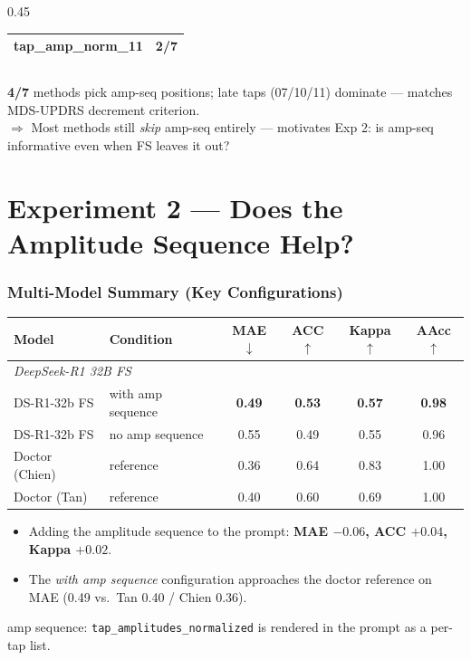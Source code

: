 \documentclass[aspectratio=169]{beamer}
\begin{document}
\begin{frame}
\begin{columns}[T]
\begin{column}{0.45\textwidth}
\begin{tabular}{lc}
                \cellcolor{green!15}tap\_amp\_norm\_11 & \cellcolor{green!15}2/7 \\
                \bottomrule
            \end{tabular}
        \end{column}
    \end{columns}
    \vspace{0.2em}
    \scriptsize
    \textbf{4/7} methods pick amp-seq positions; late taps (07/10/11) dominate --- matches MDS-UPDRS decrement criterion.\\
    \textbf{$\Rightarrow$} Most methods still \emph{skip} amp-seq entirely --- motivates Exp 2: is amp-seq informative even when FS leaves it out?
\end{frame}

\section{Experiment 2 --- Does the Amplitude Sequence Help?}

\begin{frame}
    \frametitle{Multi-Model Summary (Key Configurations)}
    {\scriptsize
    \setlength{\tabcolsep}{3pt}
    \begin{center}
    \begin{tabular}{llcccc}
        \toprule
        \textbf{Model} & \textbf{Condition} & \textbf{MAE}$\downarrow$ & \textbf{ACC}$\uparrow$ & \textbf{Kappa}$\uparrow$ & \textbf{AAcc}$\uparrow$ \\
        \midrule
        \multicolumn{6}{l}{\textit{DeepSeek-R1 32B FS}} \\
        DS-R1-32b FS & with amp sequence & \cellcolor{green!15}\textbf{0.49} & \cellcolor{green!15}\textbf{0.53} & \cellcolor{green!15}\textbf{0.57} & \cellcolor{green!15}\textbf{0.98} \\
        DS-R1-32b FS & no amp sequence   & 0.55 & 0.49 & 0.55 & 0.96 \\
        \midrule
        \rowcolor{gray!15} Doctor (Chien) & reference & 0.36 & 0.64 & 0.83 & 1.00 \\
        \rowcolor{gray!15} Doctor (Tan)   & reference & 0.40 & 0.60 & 0.69 & 1.00 \\
        \bottomrule
    \end{tabular}
    \end{center}
    }
    \vspace{0.3em}
    \footnotesize
    \begin{itemize}\setlength{\itemsep}{1pt}
        \item Adding the amplitude sequence to the prompt: \textbf{MAE $-0.06$, ACC $+0.04$, Kappa $+0.02$}.
        \item The \emph{with amp sequence} configuration approaches the doctor reference on MAE (0.49 vs.\ Tan 0.40 / Chien 0.36).
    \end{itemize}
    \vspace{0.2em}
    \tiny{amp sequence: \texttt{tap\_amplitudes\_normalized} is rendered in the prompt as a per-tap list.}
\end{frame}
\end{document}
